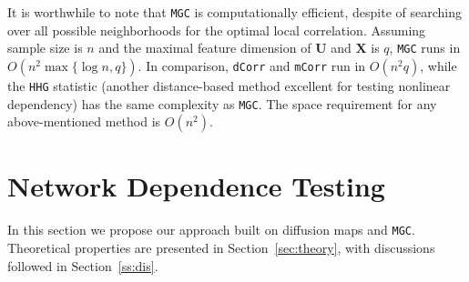 \documentclass[12pt]{article}
\theoremstyle{definition}
\begin{document}
	It is worthwhile to note that \texttt{MGC} is computationally efficient, despite of searching over all possible neighborhoods for the optimal local correlation. Assuming sample size is $n$ and the maximal feature dimension of $\mathbf{U}$ and $\mathbf{X}$ is $q$, \texttt{MGC} runs in $O(n^2 \max\{\log n,q\})$. In comparison, \texttt{dCorr} and \texttt{mCorr} run in $O(n^2 q)$, while the \texttt{HHG} statistic (another distance-based method excellent for testing nonlinear dependency) has the same complexity as \texttt{MGC}. The space requirement for any above-mentioned method is $O(n^2)$.
	
	\section{Network Dependence Testing}
	\label{sec:method}
	In this section we propose our approach built on diffusion maps and \texttt{MGC}. Theoretical properties are presented in Section~\ref{sec:theory}, with discussions followed in Section~\ref{ss:dis}.
	
\end{document}

